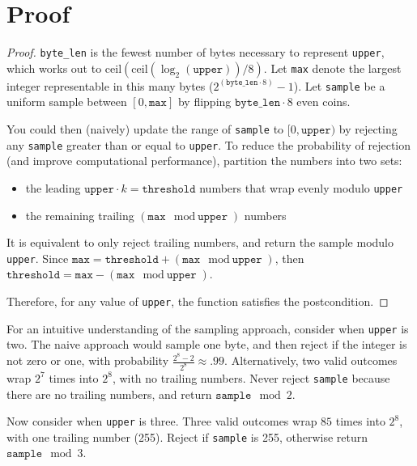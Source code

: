 \documentclass{article}
\begin{document}
\section{Proof} 
\begin{proof} 
\texttt{byte\_len} is the fewest number of bytes necessary to represent \texttt{upper},  
which works out to $\mathrm{ceil}(\mathrm{ceil}(\log_2(\texttt{upper})) / 8)$. 
Let \texttt{max} denote the largest integer representable in this many bytes ($2^{(\texttt{byte\_len} \cdot 8)} - 1$). 
Let \texttt{sample} be a uniform sample between $[0, \texttt{max}]$ by flipping $\texttt{byte\_len} \cdot 8$ even coins. 
 
You could then (naively) update the range of \texttt{sample} to $[0, \texttt{upper})$ by rejecting any \texttt{sample} greater than or equal to \texttt{upper}. 
To reduce the probability of rejection (and improve computational performance),  
partition the numbers into two sets:\ 
 
\begin{itemize} 
    \item the leading $\texttt{upper} \cdot k = \texttt{threshold}$ numbers that wrap evenly modulo \texttt{upper} 
    \item the remaining trailing $(\texttt{max} \mod \texttt{upper})$ numbers 
\end{itemize} 
 
It is equivalent to only reject trailing numbers, 
and return the sample modulo \texttt{upper}. 
Since $\texttt{max} = \texttt{threshold} + (\texttt{max} \mod \texttt{upper})$, 
then $\texttt{threshold} = \texttt{max} - (\texttt{max} \mod \texttt{upper})$. 
 
\noindent Therefore, for any value of \texttt{upper}, the function satisfies the postcondition. 
\end{proof} 

For an intuitive understanding of the sampling approach, consider when \texttt{upper} is two.
The naive approach would sample one byte, and then reject if the integer is not zero or one, 
with probability $\frac{2^8 - 2}{2^8} \approx .99$.
Alternatively, two valid outcomes wrap $2^7$ times into $2^8$, with no trailing numbers.
Never reject \texttt{sample} because there are no trailing numbers, and return $\texttt{sample} \mod 2$.

Now consider when \texttt{upper} is three.
Three valid outcomes wrap $85$ times into $2^8$, with one trailing number (255).
Reject if \texttt{sample} is 255, otherwise return $\texttt{sample} \mod 3$.
 
\end{document}
